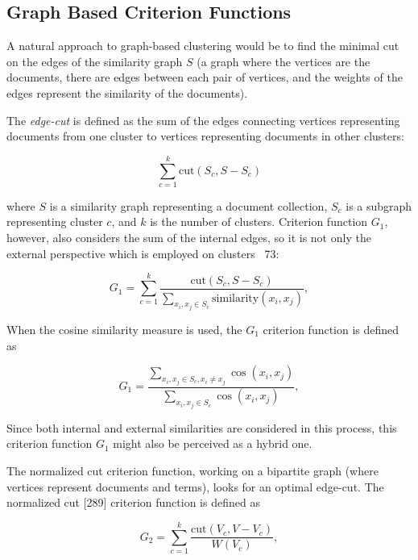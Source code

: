 \documentclass[11pt,openany,executivepaper]{book}
\begin{document}
\subsection{Graph Based Criterion Functions}

A natural approach to graph-based clustering would be to find the minimal cut on the edges 
of the similarity graph \( S \) (a graph where the vertices are the documents, there are 
edges between each pair of vertices, and the weights of the edges represent the similarity 
of the documents).

The \textit{edge-cut} is defined as the sum of the edges connecting vertices representing 
documents from one cluster to vertices representing documents in other clusters:

\begin{equation}
\sum_{c=1}^{k} \text{cut}(S_c, S - S_c)
\end{equation}

\indent
where \( S \) is a similarity graph representing a document collection,
\( S_c \) is a subgraph representing cluster \( c \), and \( k \) is the number of clusters.
Criterion function \( G_1 \), however, also considers the sum of the internal edges,
so it is not only the external perspective which is employed on clusters~ {73}:

\begin{equation}
G_1 = \sum_{c=1}^{k} 
      \frac{\text{cut}(S_c, S - S_c)}
           {\sum_{x_i, x_j \in S_c} \text{similarity}(x_i, x_j)},
\end{equation}

\indent
When the cosine similarity measure is used, the \( G_1 \) criterion function is defined as

\begin{equation}
G_1 = 
\frac{\sum_{x_i, x_j \in S_c, x_i \neq x_j} \cos(x_i, x_j)}
     {\sum_{x_i, x_j \in S_c} \cos(x_i, x_j)},
\end{equation}

\indent
Since both internal and external similarities are considered in this process,
this criterion function \( G_1 \) might also be perceived as a hybrid one.

\indent
The normalized cut criterion function, working on a bipartite graph
(where vertices represent documents and terms),
looks for an optimal edge-cut.
The normalized cut [289] criterion function is defined as

\begin{equation}
G_2 = \sum_{c=1}^{k} 
      \frac{\text{cut}(V_c, V - V_c)}{W(V_c)},
\end{equation}
\end{document}

